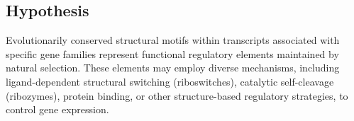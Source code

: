 \documentclass{article}
\begin{document}
\subsection{Hypothesis}

Evolutionarily conserved structural motifs within transcripts associated with specific gene families represent functional regulatory elements maintained by natural selection.
These elements may employ diverse mechanisms, including ligand-dependent structural switching (riboswitches), catalytic self-cleavage (ribozymes), protein binding, or other structure-based regulatory strategies, to control gene expression.

\newpage
\printbibliography
\end{document}
